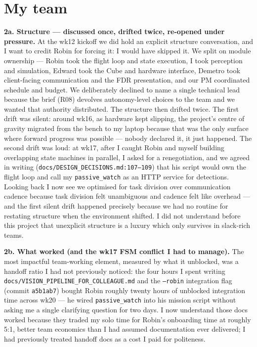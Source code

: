 \section{My team}

\textbf{2a. Structure --- discussed once, drifted twice, re-opened under pressure.}
At the wk12 kickoff we did hold an explicit structure conversation, and I want to credit Robin for forcing it: I would have skipped it. We split on module ownership --- Robin took the flight loop and state execution, I took perception and simulation, Edward took the Cube and hardware interface, Demetro took client-facing communication and the FDR presentation, and our PM coordinated schedule and budget. We deliberately declined to name a single technical lead because the brief (R08) devolves autonomy-level choices to the team and we wanted that authority distributed. The structure then drifted twice. The first drift was silent: around wk16, as hardware kept slipping, the project's centre of gravity migrated from the bench to my laptop because that was the only surface where forward progress was possible --- nobody declared it, it just happened. The second drift was loud: at wk17, after I caught Robin and myself building overlapping state machines in parallel, I asked for a renegotiation, and we agreed in writing (\texttt{docs/DESIGN\_DECISIONS.md:107--109}) that his script would own the flight loop and call my \texttt{passive\_watch} as an HTTP service for detections. Looking back I now see we optimised for task division over communication cadence because task division felt unambiguous and cadence felt like overhead --- and the first silent drift happened precisely because we had no routine for restating structure when the environment shifted. I did not understand before this project that unexplicit structure is a luxury which only survives in slack-rich teams.

\textbf{2b. What worked (and the wk17 FSM conflict I had to manage).}
The most impactful team-working element, measured by what it unblocked, was a handoff ratio I had not previously noticed: the four hours I spent writing \texttt{docs/VISION\_PIPELINE\_FOR\_COLLEAGUE.md} and the \texttt{--robin} integration flag (commit \texttt{a5b1ab7}) bought Robin roughly twenty hours of unblocked integration time across wk20 --- he wired \texttt{passive\_watch} into his mission script without asking me a single clarifying question for two days. I now understand those docs worked because they traded my solo time for Robin's onboarding time at roughly 5:1, better team economics than I had assumed documentation ever delivered; I had previously treated handoff docs as a cost I paid for politeness.

